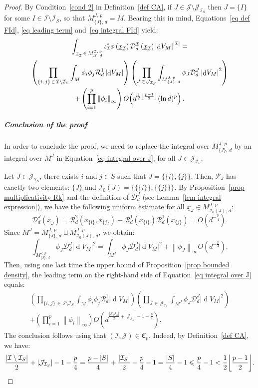 \documentclass[AHL,Unicode,longabstracts,published]{cedram}
\DeclareMathOperator{\dmesure}{d}
\DeclarePairedDelimiter{\floor}{\lfloor}{\rfloor}
\newcommand{\D}{\mathcal{D}}
\newcommand{\I}{\mathcal{I}}
\newcommand{\J}{\mathcal{J}}
\newcommand{\clR}{\mathcal{R}}
\newcommand{\frkC}{\mathfrak{C}}
\newcommand{\pa}{\mathcal{P}\!}
\newcommand{\norm}[1]{\left\lvert #1 \right\rvert}
\newcommand{\Norm}[1]{\left\lVert #1 \right\rVert}
\newcommand{\rmes}[1]{\norm{\dmesure\! V_{#1}}}
\renewcommand{\leq}{\leqslant}
\begin{document}
\begin{proof}
By Condition~\eqref{cond 2} in Definition~\ref{def CA}, if $J \in \J \setminus \J_{\I_S}$ then $J = \{I\}$ for some $I \in \I \setminus \I_S$, so that $M^{J,\,p}_{\{J\},\,d} = M$. Bearing this in mind, Equations~\eqref{eq def FId}, \eqref{eq leading term} and~\eqref{eq integral FId} yield:
\begin{multline}\label{eq integral over J}
\int_{\underline{x}_\I\,\in\,M^{\I,\,p}_{\J,\,d}} \iota_\I^*\phi\left(\underline{x}_\I\right) \D^\I_d\left(\underline{x}_\I\right) \rmes{M}^{\norm{\I}}= \\
\left(\prod_{\{i,\,j\}\,\in\,\I\setminus \I_S} \int_M \phi_i\phi_j\clR^1_d \rmes{M}\right) \left(\prod_{J\,\in\,\J_{\I_S}} \int_{M^{J,\,p}_{\{J\},\,d}}\phi_J \D_d^J \rmes{M}^2 \right)\\
+ \left(\prod_{i=1}^p \Norm{\phi_i}_\infty\right) O\!\left(d^{\frac{1}{2}\floor*{\frac{p-1}{2}}}(\ln d)^p\right).
\end{multline}

\subparagraph*{Conclusion of the proof}
In order to conclude the proof, we need to replace the integral over $M^{J,\,p}_{\{J\},\,d}$ by an integral over $M^J$ in Equation~\eqref{eq integral over J}, for all $J \in \J_{\I_S}$.

Let $J \in \J_{\I_S}$, there exists $i$ and $j \in S$ such that $J = \{\{i\},\{j\}\}$. Then, $\pa_J$ has exactly two elements: $\{J\}$ and $\I_0(J) = \{\{\{i\}\},\{\{j\}\}\}$. By Proposition~\ref{prop multiplicativity Rk} and the definition of $\D_d^J$ (see Lemma~\ref{lem integral expression}), we have the following uniform estimate for all $\underline{x}_J \in M^{J,\,p}_{\I_0(J),\,d}$:
\[
\D_d^J\left(\underline{x}_J\right) = \clR^2_d\left(x_{\{i\}},x_{\{j\}}\right) - \clR^1_d\left(x_{\{i\}}\right)\clR^1_d\left(x_{\{j\}}\right) = O\left(d^{-\frac{p}{4}}\right).
\]
Since $M^J = M^{J,\,p}_{\{J\},\,d} \sqcup M^{J,\,p}_{\I_0(J),\,d}$, we obtain:
\[
\int_{M^{J,\,p}_{\{J\},\,d}} \phi_J \D_d^J \rmes{M}^2 = \int_{M^J} \phi_J \D_d^J \rmes{M}^2 + \Norm{\phi_J}_\infty O\left(d^{-\frac{p}{4}}\right).
\]
Then, using one last time the upper bound of Proposition~\ref{prop bounded density}, the leading term on the right-hand side of Equation~\eqref{eq integral over J} equals:
\begin{multline*}
\left(\prod_{\{i,\,j\}\,\in\,\I \setminus \I_S} \int_M \phi_i\phi_j\clR^1_d \rmes{M}\right)\left(\prod_{J\,\in\,\J_{\I_S}} \int_{M^J} \phi_J \D_d^J \rmes{M}^2 \right)\\
+ \left(\prod_{i=1}^p \Norm{\phi_i}_\infty\right) O\left(d^{\frac{\norm{\I \setminus \I_S}}{2}+\norm{\J_{\I_S}}-1-\frac{p}{4}}\right).
\end{multline*}
The conclusion follows using that $(\I,\J) \in\frkC_p$. Indeed, by Definition~\ref{def CA}, we have:
\[
\frac{\norm{\I \setminus \I_S}}{2}+\norm{\J_{\I_S}}-1-\frac{p}{4} = \frac{p-\norm{S}}{4} + \frac{\norm{\I_S}}{2} - \frac{p}{4} -1 = \frac{\norm{S}}{4}-1 \leq \frac{p}{4}-1 < \frac{1}{2}\floor*{\frac{p-1}{2}}.\qedhere
\]
\end{proof}
\end{document}
